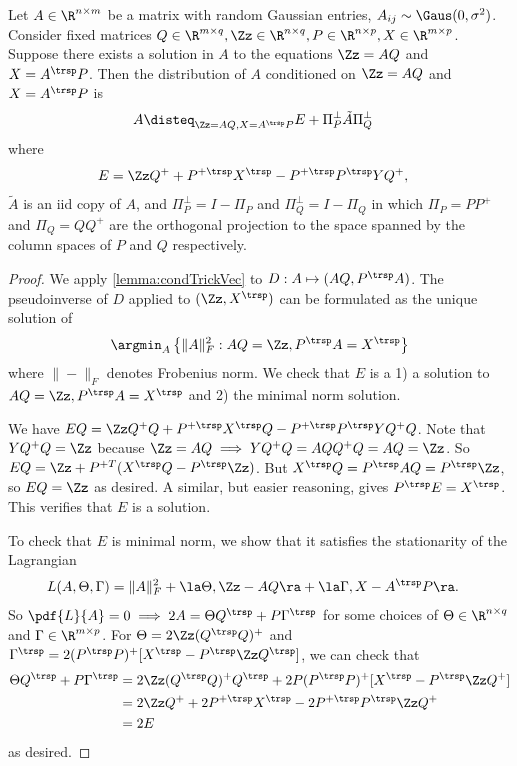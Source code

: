 \documentclass[main.tex]{subfiles}
\begin{document}
\begin{lemma}\label{lemma:condTrick}
Let $A \in \R^{n \times m}$ be a matrix with random Gaussian entries, $A_{ij} \sim \Gaus(0, \sigma^2)$.
Consider fixed matrices $Q \in \R^{m \times q}, \Zz \in \R^{n \times q}, P \in \R^{n \times p}, X \in \R^{m \times p}$.
Suppose there exists a solution in $A$ to the equations $\Zz = AQ$ and $X = A^\trsp P$.
Then the distribution of $A$ conditioned on $\Zz = AQ$ and $X = A^\trsp P$ is
\begin{align*}
    A &\disteq_{\Zz=AQ, X=A^\trsp P} E + \Pi_P^\perp \tilde A \Pi_Q^\perp
\end{align*}
where
\begin{align*}
    E
        &=
            \Zz Q^+
            + P^{+\trsp} X^\trsp
            - P^{+\trsp} P^\trsp
                YQ^+,
\end{align*}
$\tilde A$ is an iid copy of $A$,
and $\Pi_P^\perp = I - \Pi_P$ and $\Pi_Q^\perp = I - \Pi_Q$ in which $\Pi_P = PP^+$ and $\Pi_Q = QQ^+$ are the orthogonal projection to the space spanned by the column spaces of $P$ and $Q$ respectively.
\end{lemma}
\begin{proof}
We apply \cref{lemma:condTrickVec} to $D: A \mapsto (AQ, P^\trsp A)$.
The pseudoinverse of $D$ applied to $(\Zz, X^\trsp)$ can be formulated as the unique solution of
\begin{align*}
    \argmin_A \left\{ \|A\|^2_F : AQ = \Zz, P^\trsp A = X^\trsp \right\}
\end{align*}
where $\|-\|_F$ denotes Frobenius norm.
We check that $E$ is a 1) a solution to $AQ = \Zz, P^\trsp A = X^\trsp$ and 2) the minimal norm solution.

We have $EQ = 
        \Zz Q^+Q
            + P^{+\trsp} X^\trsp Q
            - P^{+\trsp} P^\trsp
                YQ^+Q$.
Note that $YQ^+Q = \Zz$ because $\Zz=AQ \implies YQ^+ Q = AQQ^+Q = AQ = \Zz$.
So $EQ = \Zz + P^{+T} (X^\trsp Q - P^\trsp \Zz)$.
But $X^\trsp Q = P^\trsp A Q = P^\trsp \Zz$, so $EQ = \Zz$ as desired.
A similar, but easier reasoning, gives $P^\trsp E = X^\trsp$.
This verifies that $E$ is a solution.

To check that $E$ is minimal norm, we show that it satisfies the stationarity of the Lagrangian
\begin{align*}
    L(A, \Theta, \Gamma)
        &=
            \|A\|^2_F + \la \Theta, \Zz - AQ \ra + \la \Gamma, X - A^\trsp P\ra.
\end{align*}
So $\pdf{L}{A} = 0 \implies 2A = \Theta Q^\trsp + P \Gamma^\trsp$ for some choices of $\Theta \in \R^{n \times q}$ and $\Gamma \in \R^{m \times p}$.
For $\Theta = 2 \Zz (Q^\trsp Q)^+$ and $\Gamma^\trsp = 2(P^\trsp P)^+ [ X^\trsp - P^\trsp \Zz Q^\trsp]$, we can check that
\begin{align*}
    \Theta Q^\trsp + P \Gamma^\trsp
        &=
            2 \Zz (Q^\trsp Q)^+ Q^\trsp + 2P(P^\trsp P)^+ [ X^\trsp - P^\trsp \Zz Q^+] \\
        &=
            2 \Zz Q^+ + 2 P^{+\trsp} X^\trsp - 2P^{+\trsp} P^\trsp \Zz Q^+\\
        &=
            2E
\end{align*}
as desired.
\end{proof}
\end{document}
